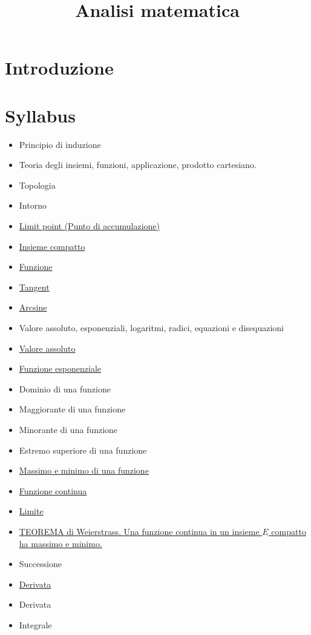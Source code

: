 \documentclass[a4paper,10pt]{article}
\title{Analisi matematica}
\author{}
\begin{document}
\maketitle


\section{Introduzione}

\section{Syllabus}
\begin{itemize}
 \item Principio di induzione
 \item Teoria degli insiemi, funzioni, applicazione, prodotto cartesiano.
 \item Topologia
 \item Intorno
 \item \href{LimitPoint.html}{Limit point (Punto di accumulazione)}
 \item \href{InsiemeCompatto.html}{Insieme compatto}
 \item \href{Function.html}{Funzione}
 \item \href{Tangent.html}{Tangent}
 \item \href{Arcsine.html}{Arcsine}
 \item Valore assoluto, esponenziali, logaritmi, radici, equazioni e disequazioni
 \item \href{./ValoreAssoluto.html}{Valore assoluto}
 \item \href{./FunzioneEsponenziale.html}{Funzione esponenziale}
 \item Dominio di una funzione
 \item Maggiorante di una funzione
 \item Minorante di una funzione
 \item Estremo superiore di una funzione
 \item \href{FunzioneMassimoMinimo.html}{Massimo e minimo di una funzione}
 \item \href{FunzioneContinua.html}{Funzione continua}
 \item \href{Limite.html}{Limite}
 \item \href{Weierstrass.html}{TEOREMA di Weierstrass. Una funzione continua in un insieme $E$ compatto ha massimo e minimo.}
 \item Successione
 \item \href{Derivata.html}{Derivata} 
 \item Derivata
 \item Integrale
\end{itemize}
\end{document}
